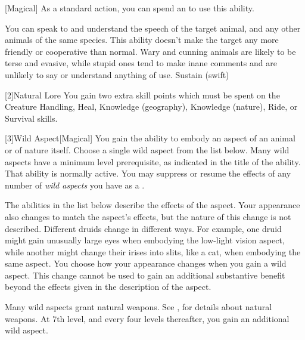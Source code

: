         [Magical] As a standard action, you can spend an  to use this ability.
        \begin{ability}
            \begin{spelltargetinginfo}
            \end{spelltargetinginfo}
            \begin{spelleffects}
                \spelleffect You can speak to and understand the speech of the target animal, and any other animals of the same species.
                This ability doesn't make the target any more friendly or cooperative than normal.
                Wary and cunning animals are likely to be terse and evasive, while stupid ones tend to make inane comments and are unlikely to say or understand anything of use.
                \spelldur Sustain (swift)
            \end{spelleffects}
        \end{ability}

        [2]{Natural Lore}
        You gain two extra skill points which must be spent on the Creature Handling, Heal, Knowledge (geography), Knowledge (nature), Ride, or Survival skills.

        [3]{Wild Aspect}[Magical]
        You gain the ability to embody an aspect of an animal or of nature itself.
        Choose a single wild aspect from the list below.
        Many wild aspects have a minimum level prerequisite, as indicated in the title of the ability.
        That ability is normally active.
        You may suppress or resume the effects of any number of \textit{wild aspects} you have as a .

        The abilities in the list below describe the effects of the aspect.
        Your appearance also changes to match the aspect's effects, but the nature of this change is not described.
        Different druids change in different ways.
        For example, one druid might gain unusually large eyes when embodying the low-light vision aspect, while another might change their irises into slits, like a cat, when embodying the same aspect.
        You choose how your appearance changes when you gain a wild aspect.
        This change cannot be used to gain an additional substantive benefit beyond the effects given in the description of the aspect.

        Many wild aspects grant natural weapons.
        See , for details about natural weapons.
        At 7th level, and every four levels thereafter, you gain an additional wild aspect.

